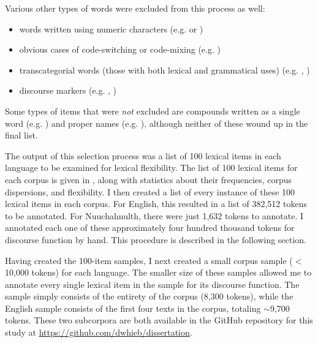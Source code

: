 Various other types of words were excluded from this process as well:

\begin{itemize}

  \singlespacing

  \item words written using numeric characters (e.g.  or )

  \item obvious cases of code-switching or code-mixing (e.g.  )

  \item transcategorial words (those with both lexical and grammatical uses) (e.g. , )

  \item discourse markers (e.g. , )

\end{itemize}

\noindent Some types of items that were \emph{not} excluded are compounds written as a single word (e.g. ) and proper names (e.g. ), although neither of these wound up in the final list.

The output of this selection process was a list of 100 lexical items in each language to be examined for lexical flexibility. The list of 100 lexical items for each corpus is given in , along with statistics about their frequencies, corpus dispersions, and flexibility. I then created a list of every instance of these 100 lexical items in each corpus. For English, this resulted in a list of 382,512 tokens to be annotated. For Nuuchahnulth, there were just 1,632 tokens to annotate. I annotated each one of these approximately four hundred thousand tokens for discourse function by hand. This procedure is described in the following section.

Having created the 100-item samples, I next created a small corpus sample ($<$10,000 tokens) for each language. The smaller size of these samples allowed me to annotate every single lexical item in the sample for its discourse function. The  sample simply consists of the entirety of the corpus (8,300 tokens), while the English sample consists of the first four texts in the corpus, totaling $\sim$9,700 tokens. These two subcorpora are both available in the GitHub repository for this study at \url{https://github.com/dwhieb/dissertation}.


